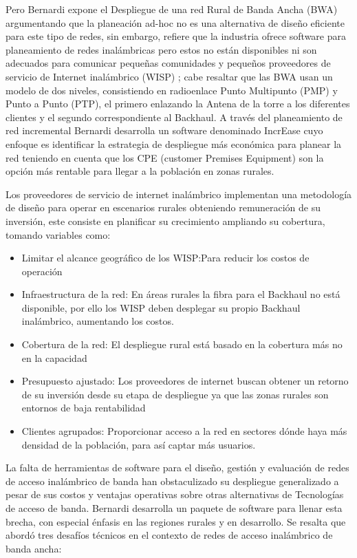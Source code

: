 \documentclass[]{article}
\begin{document}
Pero Bernardi expone el Despliegue de una red Rural de Banda Ancha (BWA)
argumentando que la planeación ad-hoc no es una alternativa de diseño
eficiente para este tipo de redes, sin embargo, refiere que la industria
ofrece software para planeamiento de redes inalámbricas pero estos no
están disponibles ni son adecuados para comunicar pequeñas comunidades y
pequeños proveedores de servicio de Internet inalámbrico (WISP) ; cabe
resaltar que las BWA usan un modelo de dos niveles, consistiendo en
radioenlace Punto Multipunto (PMP) y Punto a Punto (PTP), el primero
enlazando la Antena de la torre a los diferentes clientes y el segundo
correspondiente al Backhaul. A través del planeamiento de red
incremental Bernardi desarrolla un software denominado IncrEase cuyo
enfoque es identificar la estrategia de despliegue más económica para
planear la red teniendo en cuenta que los CPE (customer Premises
Equipment) son la opción más rentable para llegar a la población en
zonas rurales.

Los proveedores de servicio de internet inalámbrico implementan una
metodología de diseño para operar en escenarios rurales obteniendo
remuneración de su inversión, este consiste en planificar su crecimiento
ampliando su cobertura, tomando variables como:

\begin{itemize}
\item
  Limitar el alcance geográfico de los WISP:Para reducir los costos de
  operación
\item
  Infraestructura de la red: En áreas rurales la fibra para el Backhaul
  no está disponible, por ello los WISP deben desplegar su propio
  Backhaul inalámbrico, aumentando los costos.
\item
  Cobertura de la red: El despliegue rural está basado en la cobertura
  más no en la capacidad
\item
  Presupuesto ajustado: Los proveedores de internet buscan obtener un
  retorno de su inversión desde su etapa de despliegue ya que las zonas
  rurales son entornos de baja rentabilidad
\item
  Clientes agrupados: Proporcionar acceso a la red en sectores dónde
  haya más densidad de la población, para así captar más usuarios.
\end{itemize}

La falta de herramientas de software para el diseño, gestión y
evaluación de redes de acceso inalámbrico de banda han obstaculizado su
despliegue generalizado a pesar de sus costos y ventajas operativas
sobre otras alternativas de Tecnologías de acceso de banda. Bernardi
desarrolla un paquete de software para llenar esta brecha, con especial
énfasis en las regiones rurales y en desarrollo. Se resalta que abordó
tres desafíos técnicos en el contexto de redes de acceso inalámbrico de
banda ancha:
\end{document}
